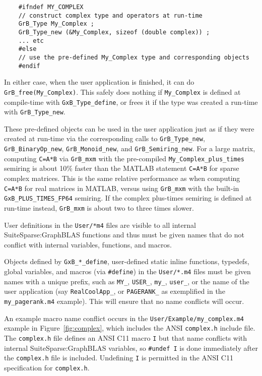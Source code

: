 \documentclass[12pt]{article}
\begin{document}
{\footnotesize
\begin{verbatim}
    #ifndef MY_COMPLEX
    // construct complex type and operators at run-time
    GrB_Type My_Complex ;
    GrB_Type_new (&My_Complex, sizeof (double complex)) ;
    ... etc
    #else
    // use the pre-defined My_Complex type and corresponding objects
    #endif \end{verbatim}}

\noindent
In either case, when the user application is finished, it can do
\verb'GrB_free(My_Complex)'.  This safely does nothing if \verb'My_Complex' is
defined at compile-time with \verb'GxB_Type_define', or frees it if the type
was created a run-time with \verb'GrB_Type_new'.

These pre-defined objects can be used in the user application just as if they
were created at run-time via the corresponding calls to \verb'GrB_Type_new',
\verb'GrB_BinaryOp_new', \verb'GrB_Monoid_new', and \verb'GrB_Semiring_new'.
For a large matrix, computing \verb'C=A*B' via \verb'GrB_mxm' with the
pre-compiled \verb'My_Complex_plus_times' semiring is about 10\% faster than
the MATLAB statement \verb'C=A*B' for sparse complex matrices.  This is the same
relative performance as when computing \verb'C=A*B' for real matrices in
MATLAB, versus using \verb'GrB_mxm' with the built-in
\verb'GxB_PLUS_TIMES_FP64' semiring.  If the complex plus-times semiring is
defined at run-time instead, \verb'GrB_mxm' is about two to three times slower.

User definitions in the \verb'User/*m4' files are visible to all internal
SuiteSparse:GraphBLAS functions and thus must be given names that do not
conflict with internal variables, functions, and macros.

Objects defined by \verb'GxB_*_define', user-defined static inline functions,
typedefs, global variables, and macros (via \verb'#define') in the
\verb'User/*.m4' files must be given names with a unique prefix, such as
\verb'MY_', \verb'USER_', \verb'my_', \verb'user_',
or the name of the user application (say
\verb'RealCoolApp_', or \verb'PAGERANK_' as exemplified in the
\verb'my_pagerank.m4' example).  This will ensure that no name conflicts will
occur.

An example macro name conflict occurs in the \verb'User/Example/my_complex.m4'
example in Figure~\ref{fig:complex}, which includes the ANSI \verb'complex.h'
include file.  The \verb'complex.h' file defines an ANSI C11 macro \verb'I' but
that name conflicts with internal SuiteSparse:GraphBLAS variables, so
\verb'#undef I' is done immediately after the \verb'complex.h' file is
included.  Undefining \verb'I' is permitted in the ANSI C11 specification
for \verb'complex.h'.
\end{document}
